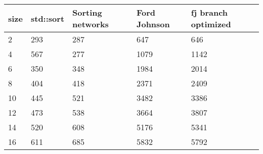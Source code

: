 \begin{tabular}{|l|l|l|l|l|}\hline
	size&std::sort&Sorting networks&Ford Johnson&fj branch optimized\\\hline
	2&293&287&647&646\\
	4&567&277&1079&1142\\
	6&350&348&1984&2014\\
	8&404&418&2371&2409\\
	10&445&521&3482&3386\\
	12&473&538&3664&3807\\
	14&520&608&5176&5341\\
	16&611&685&5832&5792\\\hline
\end{tabular}
